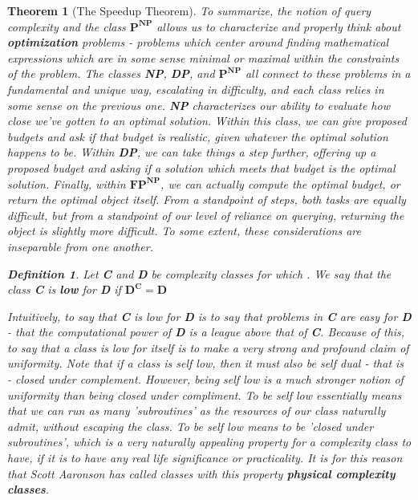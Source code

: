 \documentclass{article}
\theoremstyle{definition}
\newtheorem{definition}{Definition}[section]
\theoremstyle{plain}
\theoremstyle{theorem}
\newtheorem{theorem}{Theorem}[section]
\begin{document}
\begin{theorem}[The Speedup Theorem]
To summarize, the notion of query complexity and the class $\textbf{P}^{\textbf{NP}}$ allows us to characterize and properly think about \textbf{optimization} problems - problems which center around finding mathematical expressions which are in some sense minimal or maximal within the constraints of the problem. The classes \textbf{NP}, \textbf{DP}, and $\textbf{P}^{\textbf{NP}}$ all connect to these problems in a fundamental and unique way, escalating in difficulty, and each class relies in some sense on the previous one. \textbf{NP} characterizes our ability to evaluate how close we've gotten \textit{to} an optimal solution. Within this class, we can give proposed budgets and ask if that budget is realistic, given \textit{whatever} the optimal solution happens to be. Within \textbf{DP}, we can take things a step further, offering up a proposed budget and asking if a solution which meets that budget \textit{is} the optimal solution. Finally, within $\textbf{FP}^{\textbf{NP}}$, we can actually compute the optimal budget, or return the optimal object itself. From a standpoint of steps, both tasks are equally difficult, but from a standpoint of our level of reliance on querying, returning the object is slightly more difficult. To some extent, these considerations are inseparable from one another.
\begin{definition}
    Let \textbf{C} and \textbf{D} be complexity classes for which . We say that the class \textbf{C} is \textbf{low} for \textbf{D} if $\textbf{D}^{\textbf{C}} = \textbf{D}$
\end{definition}
Intuitively, to say that \textbf{C} is low for \textbf{D} is to say that problems in \textbf{C} are \textit{easy} for \textbf{D} - that the computational power of \textbf{D} is a league above that of \textbf{C}. Because of this, to say that a class is low for \textit{itself} is to make a very strong and profound claim of uniformity. Note that if a class is self low, then it must also be self dual - that is - closed under complement. However, being self low is a much stronger notion of uniformity than being closed under compliment. To be self low essentially means that we can run as many 'subroutines' as the resources of our class naturally admit, without escaping the class. To be self low means to be 'closed under subroutines', which is a very naturally appealing property for a complexity class to have, if it is to have any real life significance or practicality. It is for this reason that Scott Aaronson has called classes with this property \textbf{physical complexity classes}.

\end{theorem}
\end{document}
